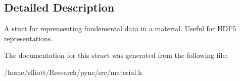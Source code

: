 \subsection{Detailed Description}
A stuct for reprensenting fundemental data in a material. Useful for H\-D\-F5 representations. 

The documentation for this struct was generated from the following file\-:\begin{DoxyCompactItemize}
\item 
/home/elliott/\-Research/pyne/src/material.\-h\end{DoxyCompactItemize}
